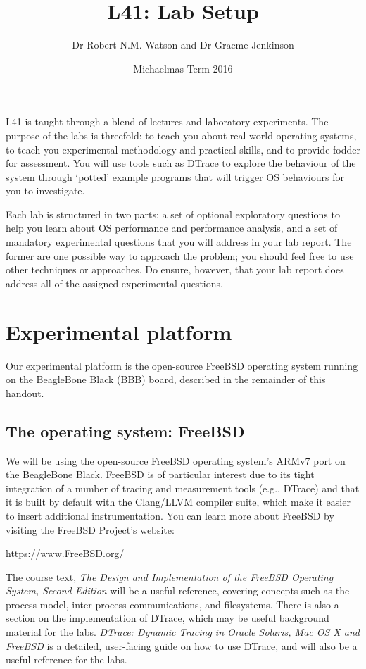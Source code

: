\documentclass[a4paper,10pt]{article}
\begin{document}
\title{L41: Lab Setup}
\author{Dr Robert N.M. Watson and Dr Graeme Jenkinson}
\date{Michaelmas Term 2016}
\maketitle

L41 is taught through a blend of lectures and laboratory experiments.
The purpose of the labs is threefold: to teach you about real-world operating
systems, to teach you experimental methodology and practical skills, and to
provide fodder for assessment.
You will use tools such as DTrace to explore the behaviour of the system
through `potted' example programs that will trigger OS behaviours for you to
investigate.

Each lab is structured in two parts: a set of optional exploratory questions
to help you learn about OS performance and performance analysis, and a set of
mandatory experimental questions that you will address in your lab report.
The former are one possible way to approach the problem; you should feel free
to use other techniques or approaches.
Do ensure, however, that your lab report does address all of the assigned
experimental questions.

\section*{Experimental platform}

Our experimental platform is the open-source FreeBSD operating system running
on the BeagleBone Black (BBB) board, described in the remainder of this
handout.

\subsection*{The operating system: FreeBSD}

We will be using the open-source FreeBSD operating system's ARMv7 port on the
BeagleBone Black.
FreeBSD is of particular interest due to its tight integration of a number of
tracing and measurement tools (e.g., DTrace) and that it is built by default
with the Clang/LLVM compiler suite, which make it easier to insert additional
instrumentation.
You can learn more about FreeBSD by visiting the FreeBSD Project's website:

\smallskip
\url{https://www.FreeBSD.org/}
\smallskip

The course text, \textit{The Design and Implementation of the FreeBSD
Operating System, Second Edition} will be a useful reference, covering
concepts such as the process model, inter-process communications, and
filesystems.
There is also a section on the implementation of DTrace, which may be useful
background material for the labs.
\textit{DTrace: Dynamic Tracing in Oracle Solaris, Mac OS X and FreeBSD} is a
detailed, user-facing guide on how to use DTrace, and will also be a useful
reference for the labs.
\end{document}
